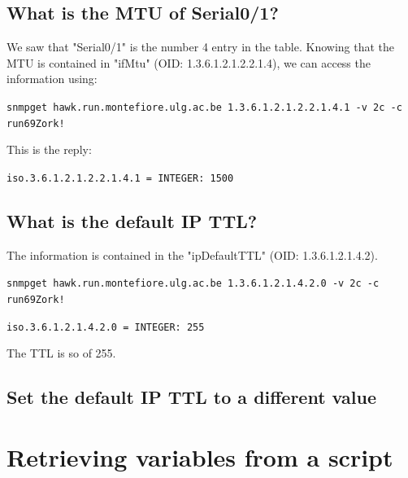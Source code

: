 \documentclass[a4paper,titlepage]{article}
\begin{document}
	\subsection{What is the MTU of Serial0/1?}
We saw that "Serial0/1" is the number 4 entry in the table. Knowing that the MTU is contained in "ifMtu" (OID: 1.3.6.1.2.1.2.2.1.4), we can access the information using: 
\begin{center}
	\texttt{snmpget hawk.run.montefiore.ulg.ac.be 1.3.6.1.2.1.2.2.1.4.1 -v 2c -c run69Zork!}
\end{center}
This is the reply: 
\begin{center}
	\texttt{iso.3.6.1.2.1.2.2.1.4.1 = INTEGER: 1500}
\end{center}

	\subsection{What is the default IP TTL?}
The information is contained in the "ipDefaultTTL" (OID: 1.3.6.1.2.1.4.2). 

\begin{center}
	\texttt{snmpget hawk.run.montefiore.ulg.ac.be 1.3.6.1.2.1.4.2.0 -v 2c -c run69Zork!}
\end{center}
\begin{center}
	\texttt{iso.3.6.1.2.1.4.2.0 = INTEGER: 255}
\end{center}
The TTL is so of 255.

	\subsection{Set the default IP TTL to a different value}


\section{Retrieving variables from a script}


\newpage
\end{document}
